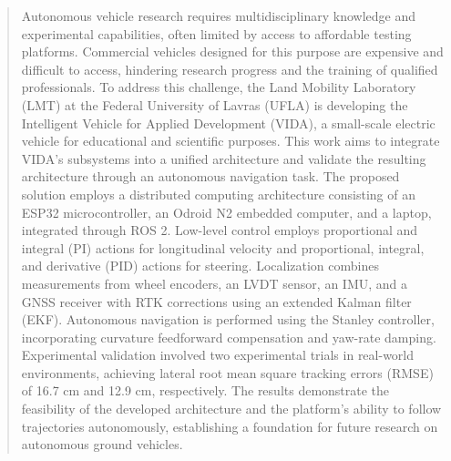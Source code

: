 \documentclass[a4paper]{ifacconf}
\begin{document}
\begin{frontmatter}
\renewcommand{\abstractname}{{\bf Abstract:~}}
\begin{abstract}                %
Autonomous vehicle research requires multidisciplinary knowledge and experimental capabilities, often limited by access to affordable testing platforms. Commercial vehicles designed for this purpose are expensive and difficult to access, hindering research progress and the training of qualified professionals. To address this challenge, the Land Mobility Laboratory (LMT) at the Federal University of Lavras (UFLA) is developing the Intelligent Vehicle for Applied Development (VIDA), a small-scale electric vehicle for educational and scientific purposes. This work aims to integrate VIDA's subsystems into a unified architecture and validate the resulting architecture through an autonomous navigation task. The proposed solution employs a distributed computing architecture consisting of an ESP32 microcontroller, an Odroid N2 embedded computer, and a laptop, integrated through ROS 2. Low-level control employs proportional and integral (PI) actions for longitudinal velocity and proportional, integral, and derivative (PID) actions for steering. Localization combines measurements from wheel encoders, an LVDT sensor, an IMU, and a GNSS receiver with RTK corrections using an extended Kalman filter (EKF). Autonomous navigation is performed using the Stanley controller, incorporating curvature feedforward compensation and yaw-rate damping. Experimental validation involved two experimental trials in real-world environments, achieving lateral root mean square tracking errors (RMSE) of 16.7 cm and 12.9 cm, respectively. The results demonstrate the feasibility of the developed architecture and the platform's ability to follow trajectories autonomously, establishing a foundation for future research on autonomous ground vehicles.




\end{abstract}
\end{frontmatter}
\end{document}

